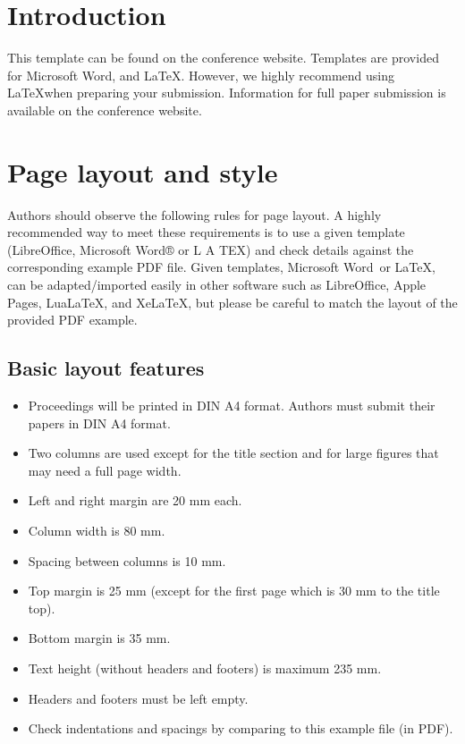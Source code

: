 \section{Introduction}

This template can be found on the conference website. Templates are provided for Microsoft Word\textregistered, and \LaTeX. However, we highly recommend using \LaTeX when preparing your submission. Information for full paper submission is available on the conference website.

\section{Page layout and style}

Authors should observe the following rules for page layout. A highly recommended way to meet these requirements is to use a given template (LibreOffice, Microsoft Word® or L A TEX) and check details against the corresponding example PDF file. Given templates, Microsoft Word\textregistered\ or \LaTeX, can be adapted/imported easily in other software such as LibreOffice, Apple Pages, Lua\LaTeX, and Xe\LaTeX, but please be careful to match the layout of the provided PDF example.

\subsection{Basic layout features}

\begin{itemize}
\item Proceedings will be printed in DIN A4 format. Authors must submit their papers in DIN A4 format.
\item Two columns are used except for the title section and for large figures that may need a full page width.
\item Left and right margin are 20 mm each. 
\item Column width is 80 mm. 
\item Spacing between columns is 10 mm.
\item Top margin is 25 mm (except for the first page which is 30 mm to the title top).
\item Bottom margin is 35 mm.
\item Text height (without headers and footers) is maximum 235 mm.
\item Headers and footers must be left empty.
\item Check indentations and spacings by comparing to this example file (in PDF).
\end{itemize}

